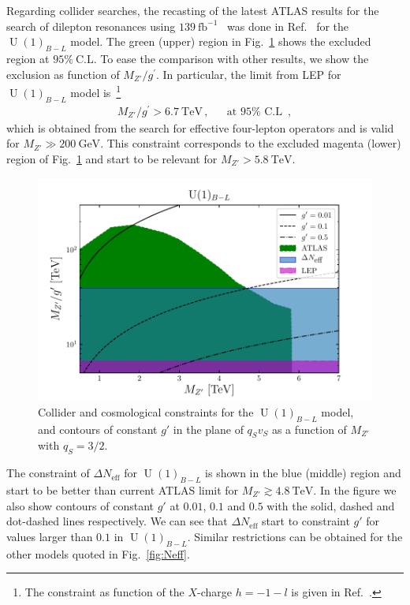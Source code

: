 \documentclass[12pt]{article}
\begin{document}
Regarding collider searches, the recasting of the latest ATLAS results for the search of dilepton resonances using $139\ \text{fb}^{-1}$~\cite{Aad:2019fac} was done
in Ref.~\cite{Chiang:2019ajm} for the $\operatorname{U}(1)_{B-L}$ model.
The green (upper) region in Fig.~\ref{fig:u1blc} shows the excluded region at $95\%\ \text{C.L.}$ To ease the comparison with other results, we show the exclusion as function of $M_{Z'}/g^{\prime}$. In particular, the limit from LEP for $\operatorname{U}(1)_{B-L}$ model is~\cite{Carena:2004xs,Heeck:2014zfa}\footnote{The constraint as function of the $X$-charge $h=-1-l$ is given in Ref.~\cite{Okada:2016tci}. }
\begin{align} 
  M_{Z'}/g^{\prime}>6.7\ \text{TeV}\,,&&\text{at $95\%$ C.L }\,,
\end{align}
which is obtained from the search for effective four-lepton operators and is valid for $M_{Z'}\gg 200\ \text{GeV}$. This constraint corresponds to the excluded magenta (lower) region of Fig.~\ref{fig:u1blc} and start to be relevant for $M_{Z'}>5.8\ \text{TeV}$.

\begin{figure}[t]
    \centering
    \includegraphics[scale=1.0]{u1blc}
    \caption{Collider and cosmological constraints for the $\operatorname{U}(1)_{B-L}$ model, and contours of constant $g'$ in the plane of $q_S v_S$ as a function of $M_{Z'}$ with $q_S=3/2$.}
    \label{fig:u1blc}
\end{figure}

The constraint of $\Delta N_{\text{eff}}$ for $\operatorname{U}(1)_{B-L}$ is shown in the blue (middle) region and start to be better than current ATLAS limit for $M_{Z'}\gtrsim 4.8\ \text{TeV}$. In the figure we also show contours of constant $g'$ at $0.01$, $0.1$ and $0.5$ with the solid, dashed and dot-dashed lines respectively. We can see that $\Delta N_{\text{eff}}$ start to constraint $g'$ for values larger than $0.1$ in $\operatorname{U}(1)_{B-L}$.    Similar restrictions can be obtained for the other models quoted in Fig.~\ref{fig:Neff}.
\end{document}
